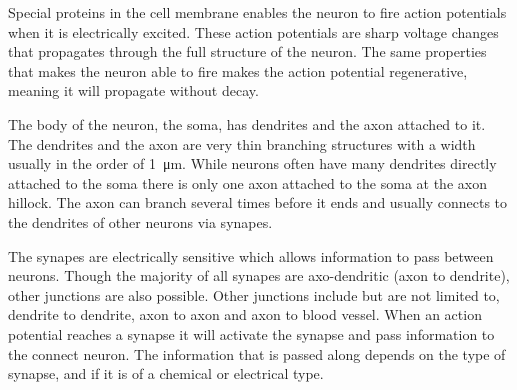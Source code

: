 \documentclass[altfont, fleqn]{uiophd}
\begin{document}
Special proteins in the cell membrane enables the neuron to
fire action potentials when it is electrically excited. 
These action potentials are sharp voltage changes that propagates through
the full structure of the neuron.
The same properties that makes the neuron able to fire makes 
the action potential {regenerative}, meaning it will propagate
without decay.

The body of the neuron, the {soma}, has {dendrites} and 
the axon attached to it. 
The dendrites and the axon are very thin branching structures 
with a width usually in the order of \SI{1}{\micro\metre}. 
While neurons often have many dendrites directly attached to the soma
there is only one axon attached to the soma at the axon hillock.
The axon can branch several times before it ends and 
usually connects to the dendrites of other neurons via synapes.

The synapes are electrically sensitive which allows information
to pass between neurons. 
Though the majority of all synapes are axo-dendritic 
(axon to dendrite),
other junctions are also possible.
Other junctions include but are not limited to,
dendrite to dendrite, 
axon to axon and 
axon to blood vessel. 
When an action potential reaches a synapse it will activate
the synapse and pass information to the connect neuron. 
The information that is passed along depends on the type of synapse,
and if it is of a chemical or electrical type.



\end{document}
